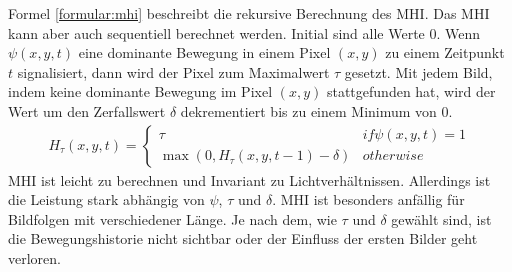 \newline
\newline
Formel \ref{formular:mhi} beschreibt die rekursive Berechnung des MHI. Das MHI kann aber auch sequentiell berechnet werden. Initial sind alle Werte 0. Wenn $\psi(x,y,t)$ eine dominante Bewegung in einem Pixel $(x,y)$
zu einem Zeitpunkt $t$ signalisiert, dann wird der Pixel zum Maximalwert $\tau$ gesetzt. Mit jedem Bild, indem keine dominante Bewegung im Pixel $(x,y)$ stattgefunden hat, wird der Wert um den
Zerfallswert $\delta$ dekrementiert bis zu einem Minimum von 0.
\begin{align}
    H_{\tau}(x,y,t) = \begin{cases}
                          \tau & if \psi(x,y,t) = 1 \\
                          \max(0, H_{\tau}(x,y,t-1) - \delta) & otherwise
    \end{cases}
    \label{formular:mhi}
\end{align}
MHI ist leicht zu berechnen und Invariant zu Lichtverhältnissen. Allerdings ist die Leistung stark abhängig von $\psi$, $\tau$ und $\delta$. MHI ist besonders anfällig für Bildfolgen mit verschiedener Länge.
Je nach dem, wie $\tau$ und $\delta$ gewählt sind, ist die Bewegungshistorie nicht sichtbar oder der Einfluss der ersten Bilder geht verloren.